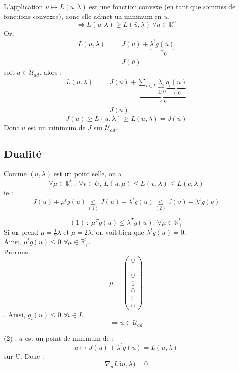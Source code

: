 \begin{dem}
L'application $u\mapsto L(u,\lambda)$ est une fonction convexe (en tant que sommes de fonctions convexes), donc elle admet un minimum en $\bar{u}$.
\[\Rightarrow L(u,\lambda)\geq L(\bar{u},\lambda)\ \forall u\in\mathbb{R}^n\]
Or, \begin{eqnarray*}
L(\bar{u},\lambda)&=&J(\bar{u})+\underbrace{\lambda^t g(\bar{u})}_{=0} \\
		&=&J(\bar{u})
\end{eqnarray*}
soit $u\in\mathcal{U}_{ad}$. alors :
\begin{eqnarray*}
L(u,\lambda)&=&J(u)+\underbrace{\sum_{i\in I} \underbrace{\lambda_i}_{\geq 0} \underbrace{g_i(u)}_{\leq 0}}_{\leq 0}\\
	&=&J(u)
\end{eqnarray*}
\[J(u)\geq L(u,\lambda)\geq L(\bar{u},\lambda)=J(\bar{u})\]
Donc $\bar{u}$ est un minimum de $J$ sur $\mathcal{U}_{ad}$.
\end{dem}

\subsection{Dualité}


\begin{dem}
Comme $(u,\lambda)$ est un point selle, on a 
\[\forall \mu\in\mathbb{R}^l_+,\ \forall v\in U,\ L(u,\mu)\leq L(u,\lambda)\leq L(v,\lambda)\]
ie :
\[J(u)+\mu^tg(u)\underset{(1)}{\leq} J(u)+\lambda^tg(u) \underset{(2)}{\leq} J(v)+\lambda^tg(v)\]

\[(1)\ :\ \mu^Tg(u)\leq \lambda^Tg(u),\ \forall \mu\in\mathbb{R}^l_+\]
Si on prend $\mu=\frac{1}{2}\lambda$ et $\mu=2\lambda$, on voit bien que $\lambda^tg(u)=0$.\\
Ainsi, $\mu^tg(u)\leq 0$ $\forall\mu\in\mathbb{R}^l_+$.\\
Prenons \[\mu=\begin{pmatrix} 0 \\ \vdots \\ 0 \\ 1 \\ 0 \\ \vdots \\ 0 \end{pmatrix}\]. Ainsi, $g_i(u)\leq 0$ $\forall i\in I$.
\[\Rightarrow u\in\mathcal{U}_{ad}\]

(2) : $u$ est un point de minimum de :
\[u\mapsto J(u)+\lambda^tg(u)=L(u,\lambda)\]
sur U. Donc :
\[\nabla_u L5u,\lambda)=0\]
\end{dem}


